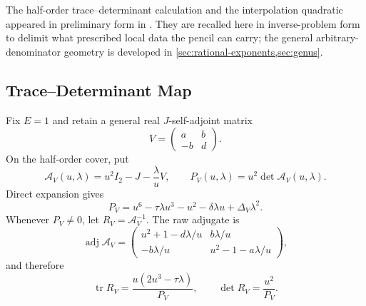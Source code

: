 \documentclass[11pt,reqno]{amsart}
\theoremstyle{remark}
\newcommand{\tr}{\operatorname{tr}}
\newcommand{\cA}{\mathcal A}
\begin{document}
The half-order trace--determinant calculation and the interpolation
quadratic appeared in preliminary form in \cite{Liu2026LocalHP}.  They are
recalled here in inverse-problem form to delimit what prescribed local data
the pencil can carry; the general arbitrary-denominator geometry is
developed in \cref{sec:rational-exponents,sec:genus}.

\subsection{Trace--Determinant Map}

Fix $E=1$ and retain a general real $J$-self-adjoint matrix
\begin{equation}\label{eq:interpolation-general-V}
 V=\begin{pmatrix}a&b\\-b&d\end{pmatrix}.
\end{equation}
On the half-order cover, put
\begin{equation}\label{eq:interpolation-general-pencil}
 \cA_V(u,\lambda)=u^2I_2-J-\frac{\lambda}{u}V,
 \qquad
 P_V(u,\lambda)=u^2\det\cA_V(u,\lambda).
\end{equation}
Direct expansion gives
\begin{equation}\label{eq:interpolation-P}
 P_V=u^6-\tau\lambda u^3-u^2-\delta\lambda u
 +\Delta_V\lambda^2.
\end{equation}
Whenever $P_V\ne0$, let $R_V=\cA_V^{-1}$.  The raw adjugate is
\begin{equation}\label{eq:interpolation-adjugate}
 \operatorname{adj}\cA_V=
 \begin{pmatrix}
 u^2+1-d\lambda/u&b\lambda/u\\
 -b\lambda/u&u^2-1-a\lambda/u
 \end{pmatrix},
\end{equation}
and therefore
\begin{equation}\label{eq:general-R-tr-det}
 \tr R_V=\frac{u(2u^3-\tau\lambda)}{P_V},
 \qquad
 \det R_V=\frac{u^2}{P_V}.
\end{equation}
\end{document}
